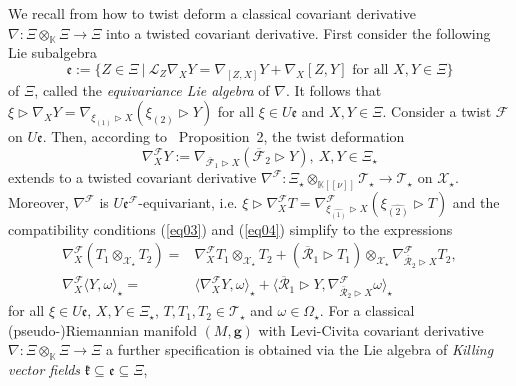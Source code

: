 \documentclass[a4paper,11pt]{article}
\begin{document}
We recall from \cite{FioreWeber} how to twist deform a classical covariant derivative
$\nabla\colon\Xi\otimes_\mathbb{K}\Xi\rightarrow\Xi$ into a twisted covariant derivative.
First consider the following Lie subalgebra
\begin{equation}
    \mathfrak{e}:=\{Z\in\Xi~|~\mathcal{L}_Z\nabla_XY=\nabla_{[Z,X]}Y+\nabla_X[Z,Y]
    \text{ for all }X,Y\in\Xi\}
\end{equation}
of $\Xi$, called the \textit{equivariance Lie algebra} of $\nabla$. It follows that
$\xi\rhd\nabla_XY=\nabla_{\xi_{(1)}\rhd X}(\xi_{(2)}\rhd Y)$ for all
$\xi\in U\mathfrak{e}$ and $X,Y\in\Xi$. Consider a twist $\mathcal{F}$ on
$U\mathfrak{e}$. Then, according to \cite{FioreWeber}~Proposition~2, the twist deformation
\begin{equation}\label{eq05}
    \nabla^\mathcal{F}_XY:=\nabla_{\overline{\mathcal{F}}_1\rhd X}
    (\overline{\mathcal{F}}_2\rhd Y),~X,Y\in\Xi_\star
\end{equation}
extends to a twisted covariant derivative
$\nabla^\mathcal{F}\colon\Xi_\star\otimes_{\mathbb{K}[[\nu]]}\mathcal{T}_\star
\rightarrow\mathcal{T}_\star$ on $\mathcal{X}_\star$. Moreover, $\nabla^\mathcal{F}$
is $U\mathfrak{e}^\mathcal{F}$-equivariant, i.e. $\xi\rhd\nabla^\mathcal{F}_XT
=\nabla^\mathcal{F}_{\xi_{\widehat{(1)}}\rhd X}(\xi_{\widehat{(2)}}\rhd T)$ and
the compatibility conditions (\ref{eq03}) and (\ref{eq04}) simplify to the expressions
\begin{equation}
\begin{split}
    \nabla^\mathcal{F}_X(T_1\otimes_{\mathcal{X}_\star}T_2)
    =&\nabla^\mathcal{F}_XT_1\otimes_{\mathcal{X}_\star}T_2
    +(\overline{\mathcal{R}}_1\rhd T_1)\otimes_{\mathcal{X}_\star}\nabla^\mathcal{F}_{
    \overline{\mathcal{R}}_2\rhd X}T_2,\\
    \nabla^\mathcal{F}_X\langle Y,\omega\rangle_\star
    =&\langle\nabla^\mathcal{F}_XY,\omega\rangle_\star
    +\langle\overline{\mathcal{R}}_1\rhd Y,
    \nabla^\mathcal{F}_{\overline{\mathcal{R}}_2\rhd X}\omega\rangle_\star
\end{split}
\end{equation}
for all $\xi\in U\mathfrak{e}$, $X,Y\in\Xi_\star$, $T,T_1,T_2\in\mathcal{T}_\star$ and
$\omega\in\Omega_\star$.  For a classical (pseudo-)Riemannian manifold $(M,\mathbf{g})$
with Levi-Civita covariant derivative $\nabla\colon\Xi\otimes_\mathbb{K}\Xi\rightarrow\Xi$
a further specification is obtained via the Lie algebra
of \textit{Killing vector fields} $\mathfrak{k}\subseteq\mathfrak{e}\subseteq\Xi$,
\end{document}
